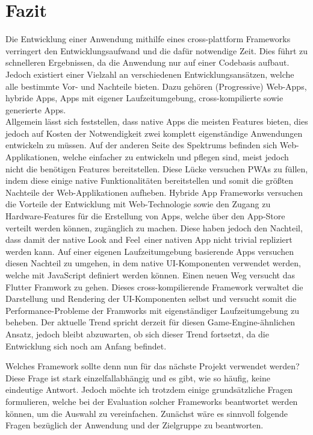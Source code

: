 \chapter{Fazit}

Die Entwicklung einer Anwendung mithilfe eines cross-plattform Frameworks verringert den Entwicklungsaufwand und die dafür notwendige Zeit. Dies führt zu schnelleren Ergebnissen, da die Anwendung nur auf einer Codebasis aufbaut. Jedoch existiert einer Vielzahl an verschiedenen Entwicklungsansätzen, welche alle bestimmte Vor- und Nachteile bieten. Dazu gehören (Progressive) Web-Apps, hybride Apps, Apps mit eigener Laufzeitumgebung, cross-kompilierte sowie generierte Apps.\\

Allgemein lässt sich feststellen, dass native Apps die meisten Features bieten, dies jedoch  auf Kosten der Notwendigkeit zwei komplett eigenständige Anwendungen entwickeln zu müssen. Auf der anderen Seite des Spektrums befinden sich Web-Applikationen, welche einfacher zu entwickeln und pflegen sind, meist jedoch nicht die benötigen Features bereitstellen. Diese Lücke versuchen \ac{PWA}s zu füllen, indem diese einige native Funktionalitäten bereitstellen und somit die größten Nachteile der Web-Applikationen aufheben. Hybride App Frameworks versuchen die Vorteile der Entwicklung mit Web-Technologie sowie den Zugang zu Hardware-Features für die Erstellung von Apps, welche über den App-Store verteilt werden können, zugänglich zu machen. Diese haben jedoch den Nachteil, dass damit der native \glqq Look and Feel\grqq\ einer nativen App nicht trivial repliziert werden kann. Auf einer eigenen Laufzeitumgebung basierende Apps versuchen diesen Nachteil zu umgehen, in dem native \ac{UI}-Komponenten verwendet werden, welche mit JavaScript definiert werden können. Einen neuen Weg versucht das Flutter Framwork zu gehen. Dieses cross-kompilierende Framework verwaltet die Darstellung und Rendering der \ac{UI}-Komponenten selbst und versucht somit die Performance-Probleme der Framworks mit eigenständiger Laufzeitumgebung zu beheben. Der aktuelle Trend spricht derzeit für diesen Game-Engine-ähnlichen Ansatz, jedoch bleibt abzuwarten, ob sich dieser Trend fortsetzt, da die Entwicklung sich noch am Anfang befindet.\\

\newpage

Welches Framework sollte denn nun für das nächste Projekt verwendet werden?
Diese Frage ist stark einzelfallabhängig und es gibt, wie so häufig, keine eindeutige Antwort. Jedoch möchte ich trotzdem einige grundsätzliche Fragen formulieren, welche bei der Evaluation solcher Frameworks beantwortet werden können, um die Auswahl zu vereinfachen.
Zunächst wäre es sinnvoll folgende Fragen bezüglich der Anwendung und der Zielgruppe zu beantworten.\\


